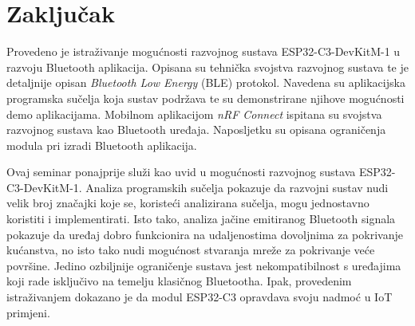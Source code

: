 \chapter{Zaključak}

Provedeno je istraživanje mogućnosti razvojnog sustava ESP32-C3-DevKitM-1 u razvoju Bluetooth aplikacija. Opisana su tehnička svojstva razvojnog sustava te je detaljnije opisan \textit{Bluetooth Low Energy} (BLE) protokol. Navedena su aplikacijska programska sučelja koja sustav podržava te su demonstrirane njihove mogućnosti demo aplikacijama. Mobilnom aplikacijom \textit{nRF Connect} ispitana su svojstva razvojnog sustava kao Bluetooth uređaja. Naposljetku su opisana ograničenja modula pri izradi Bluetooth aplikacija.

Ovaj seminar ponajprije služi kao uvid u mogućnosti razvojnog sustava ESP32-C3-DevKitM-1. Analiza programskih sučelja pokazuje da razvojni sustav nudi velik broj značajki koje se, koristeći analizirana sučelja, mogu jednostavno koristiti i implementirati. Isto tako, analiza jačine emitiranog Bluetooth signala pokazuje da uređaj dobro funkcionira na udaljenostima dovoljnima za pokrivanje kućanstva, no isto tako nudi mogućnost stvaranja mreže za pokrivanje veće površine. Jedino ozbiljnije ograničenje sustava jest nekompatibilnost s uređajima koji rade isključivo na temelju klasičnog Bluetootha. Ipak, provedenim istraživanjem dokazano je da modul ESP32-C3 opravdava svoju nadmoć u IoT primjeni. 

\eject